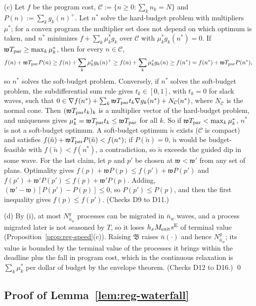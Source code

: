 (c) Let $f$ be the program cost, $\mathcal C:=\{n\ge0:\sum_kn_k=N\}$ and $P(n):=\sum_kg_k(n)^+$. Let $n^*$ solve the hard-budget problem with multipliers $\mu^*$; for a convex program the multiplier set does not depend on which optimum is taken, and $n^*$ minimizes $f+\sum_k\mu^*_kg_k$ over $\mathcal C$ with $\mu^*_kg_k(n^*)=0$. If $\mathfrak w T_{\rm par}\ge\max_k\mu^*_k$, then for every $n\in\mathcal C$,
\[
f(n)+\mathfrak w T_{\rm par}P(n)\ge f(n)+\sum_k\mu^*_kg_k(n)^+\ge f(n)+\sum_k\mu^*_kg_k(n)\ge f(n^*)=f(n^*)+\mathfrak w T_{\rm par}P(n^*),
\]
so $n^*$ solves the soft-budget problem. Conversely, if $n^*$ solves the soft-budget problem, the subdifferential sum rule gives $t_k\in[0,1]$, with $t_k=0$ for slack waves, such that $0\in\nabla f(n^*)+\sum_k\mathfrak w T_{\rm par}t_k\nabla g_k(n^*)+N_{\mathcal C}(n^*)$, where $N_{\mathcal C}$ is the normal cone. Then $(\mathfrak w T_{\rm par}t_k)_k$ is a multiplier vector of the hard-budget problem, and uniqueness gives $\mu^*_k=\mathfrak w T_{\rm par}t_k\le\mathfrak w T_{\rm par}$ for all $k$. So if $\mathfrak w T_{\rm par}<\max_k\mu^*_k$, $n^*$ is not a soft-budget optimum. A soft-budget optimum $\tilde n$ exists ($\mathcal C$ is compact) and satisfies $f(\tilde n)+\mathfrak w T_{\rm par}P(\tilde n)<f(n^*)$; if $P(\tilde n)=0$, $\tilde n$ would be budget-feasible with $f(\tilde n)<f(n^*)$, a contradiction, so $\tilde n$ exceeds the guided dip in some wave. For the last claim, let $p$ and $p'$ be chosen at $\mathfrak w<\mathfrak w'$ from any set of plans. Optimality gives $f(p)+\mathfrak w P(p)\le f(p')+\mathfrak w P(p')$ and $f(p')+\mathfrak w'P(p')\le f(p)+\mathfrak w'P(p)$. Adding, $(\mathfrak w'-\mathfrak w)[P(p')-P(p)]\le0$, so $P(p')\le P(p)$, and then the first inequality gives $f(p)\le f(p')$. (Checks D9 to D11.)

(d) By (i), at most $N^g_{\bar n_w}$ processes can be migrated in $\bar n_w$ waves, and a process migrated later is not seasoned by $T$, so it loses $h_xM_{\rm exit}s^{\rm E}$ of terminal value (Proposition~\ref{prop:reg-speed}(c)). Raising $\mathfrak B$ raises $\bar n(\cdot)$ and hence $N^g_{\bar n_w}$; its value is bounded by the terminal value of the processes it brings within the deadline plus the fall in program cost, which in the continuous relaxation is $\sum_k\mu^*_k$ per dollar of budget by the envelope theorem. (Checks D12 to D16.) \qed

\subsection*{Proof of Lemma~\ref{lem:reg-waterfall}}

